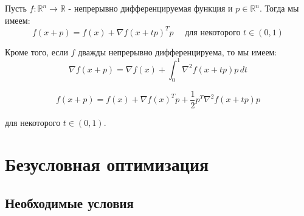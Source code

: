 \documentclass[
  russian,
  letterpaper,
  DIV=11,
  numbers=noendperiod]{scrartcl}
\begin{document}
\begin{tcolorbox}[enhanced jigsaw, opacityback=0, coltitle=black, left=2mm, colframe=quarto-callout-color-frame, rightrule=.15mm, titlerule=0mm, leftrule=.75mm, breakable, colback=white, bottomrule=.15mm, bottomtitle=1mm, toptitle=1mm, opacitybacktitle=0.6, title=\textcolor{quarto-callout-color}{\faInfo}\hspace{0.5em}{Теорема Тейлора}, colbacktitle=quarto-callout-color!10!white, arc=.35mm, toprule=.15mm]

Пусть \(f: \mathbb{R}^n \to \mathbb{R}\) - непрерывно дифференцируемая
функция и \(p \in \mathbb{R}^n\). Тогда мы имеем: \[
f(x + p) = f(x) + \nabla f(x + tp)^T p \quad \text{ для некоторого } t \in (0, 1)
\]

Кроме того, если \(f\) дважды непрерывно дифференцируема, то мы имеем:
\[
\nabla f(x + p) = \nabla f(x) + \int_0^1 \nabla^2 f(x + tp)p \, dt
\]

\[
f(x + p) = f(x) + \nabla f(x)^T p + \frac{1}{2} p^T \nabla^2 f(x + tp) p
\]

для некоторого \(t \in (0, 1)\).

\end{tcolorbox}

\section{Безусловная
оптимизация}\label{ux431ux435ux437ux443ux441ux43bux43eux432ux43dux430ux44f-ux43eux43fux442ux438ux43cux438ux437ux430ux446ux438ux44f}

\subsection{Необходимые
условия}\label{ux43dux435ux43eux431ux445ux43eux434ux438ux43cux44bux435-ux443ux441ux43bux43eux432ux438ux44f}
\end{document}

